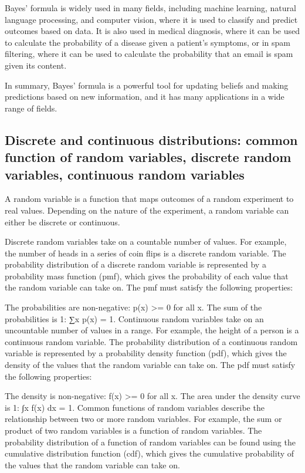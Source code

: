 \documentclass[12pt, a4paper, oneside]{article}
\begin{document}
Bayes' formula is widely used in many fields, including machine learning, natural language processing, and computer vision, where it is used to classify and predict outcomes based on data. It is also used in medical diagnosis, where it can be used to calculate the probability of a disease given a patient's symptoms, or in spam filtering, where it can be used to calculate the probability that an email is spam given its content.

In summary, Bayes' formula is a powerful tool for updating beliefs and making predictions based on new information, and it has many applications in a wide range of fields.




\subsection{ Discrete and continuous distributions: common function of random variables, discrete random variables, continuous random variables}
A random variable is a function that maps outcomes of a random experiment to real values. Depending on the nature of the experiment, a random variable can either be discrete or continuous.

Discrete random variables take on a countable number of values. For example, the number of heads in a series of coin flips is a discrete random variable. The probability distribution of a discrete random variable is represented by a probability mass function (pmf), which gives the probability of each value that the random variable can take on. The pmf must satisfy the following properties:

The probabilities are non-negative: p(x) >= 0 for all x.
The sum of the probabilities is 1: ∑x p(x) = 1.
Continuous random variables take on an uncountable number of values in a range. For example, the height of a person is a continuous random variable. The probability distribution of a continuous random variable is represented by a probability density function (pdf), which gives the density of the values that the random variable can take on. The pdf must satisfy the following properties:

The density is non-negative: f(x) >= 0 for all x.
The area under the density curve is 1: ∫x f(x) dx = 1.
Common functions of random variables describe the relationship between two or more random variables. For example, the sum or product of two random variables is a function of random variables. The probability distribution of a function of random variables can be found using the cumulative distribution function (cdf), which gives the cumulative probability of the values that the random variable can take on.
\end{document}
